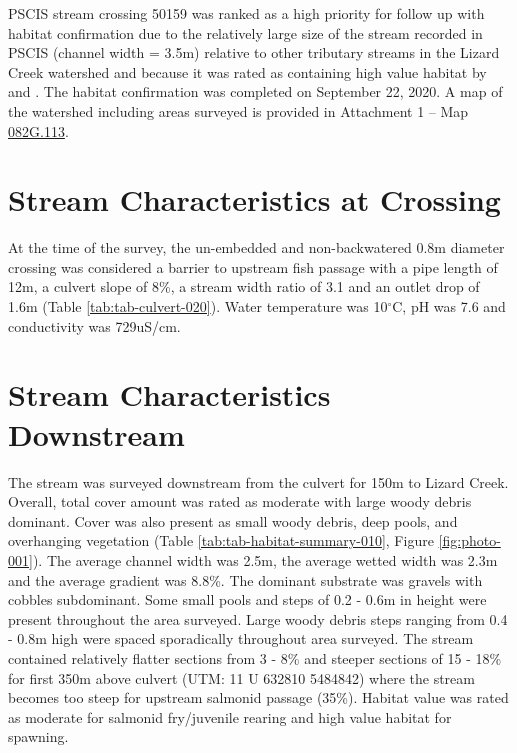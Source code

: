 \documentclass[
]{book}
\begin{document}
PSCIS stream crossing 50159 was ranked as a high priority for follow up with habitat confirmation due to the relatively large size of the stream recorded in PSCIS (channel width = 3.5m) relative to other tributary streams in the Lizard Creek watershed and because it was rated as containing high value habitat by \citet{vastFishPassage2013} and \citet{grainger2011FishPassage2011}. The habitat confirmation was completed on September 22, 2020. A map of the watershed including areas surveyed is provided in Attachment 1 -- Map \href{https://hillcrestgeo.ca/outgoing/fishpassage/projects/elk/FishPassage_082G.113.pdf}{082G.113}.

\hypertarget{stream-characteristics-at-crossing-1}{%
\section*{Stream Characteristics at Crossing}\label{stream-characteristics-at-crossing-1}}

At the time of the survey, the un-embedded and non-backwatered 0.8m diameter crossing was considered a barrier to upstream fish passage with a pipe length of 12m, a culvert slope of 8\%, a stream width ratio of 3.1 and an outlet drop of 1.6m (Table \ref{tab:tab-culvert-020}). Water temperature was 10\(^\circ\)C, pH was 7.6 and conductivity was 729uS/cm.

\hypertarget{stream-characteristics-downstream-1}{%
\section*{Stream Characteristics Downstream}\label{stream-characteristics-downstream-1}}

The stream was surveyed downstream from the culvert for 150m to Lizard Creek. Overall, total cover amount was rated as moderate with large woody debris dominant. Cover was also present as small woody debris, deep pools, and overhanging vegetation (Table \ref{tab:tab-habitat-summary-010}, Figure \ref{fig:photo-001}). The average channel width was 2.5m, the average wetted width was 2.3m and the average gradient was 8.8\%. The dominant substrate was gravels with cobbles subdominant. Some small pools and steps of 0.2 - 0.6m in height were present throughout the area surveyed. Large woody debris steps ranging from 0.4 - 0.8m high were spaced sporadically throughout area surveyed. The stream contained relatively flatter sections from 3 - 8\% and steeper sections of 15 - 18\% for first 350m above culvert (UTM: 11 U 632810 5484842) where the stream becomes too steep for upstream salmonid passage (35\%). Habitat value was rated as moderate for salmonid fry/juvenile rearing and high value habitat for spawning.
\end{document}
